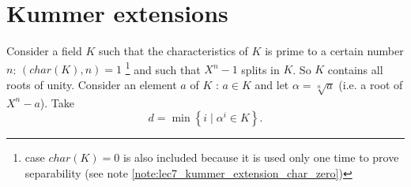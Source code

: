 \section{Kummer extensions}
\label{sec:kummerextension}

Consider a field $K$ such that the characteristics of $K$ is prime to
a certain number $n$: $\left(char(K), n\right) = 1$
\footnote{
  case $char(K) = 0$ is also included because it is used only one time
  to prove separability (see note
  \ref{note:lec7_kummer_extension_char_zero}) 
}
and such that $X^n
- 1$ splits in $K$. So $K$ contains all roots of unity. Consider an
element $a$ of $K$ : $a \in K$ and let $\alpha = \sqrt[n]{a}$ (i.e. a
root of $X^n - a$). Take
\begin{equation}
  d = \min{\left\{ i \mid \alpha^i \in
    K\right\}}.
  \label{eq:lec7_d}
\end{equation}

